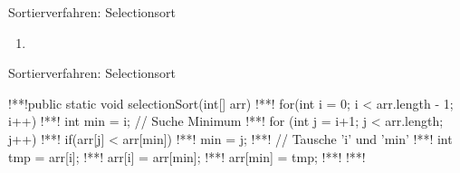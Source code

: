 \begin{frame}{Sortierverfahren: Selectionsort}
\begin{center}
\begin{minipage}{0.9\linewidth}
\begin{multicols}{2}
\begin{enumerate}[<+(1)->]
                    \item {}
                \end{enumerate}
            \end{multicols}
        \end{minipage}
    \end{center}
\end{frame}

\begin{frame}[fragile,c]{Sortierverfahren: Selectionsort}
    \begin{plainjava}
!**!public static void selectionSort(int[] arr) {
!**!    for(int i = 0; i < arr.length - 1; i++) {
!**!        int min = i; // Suche Minimum
!**!        for (int j = i+1; j < arr.length; j++)
!**!            if(arr[j] < arr[min])
!**!                min = j;
!**!        // Tausche 'i' und 'min'
!**!        int tmp = arr[i];
!**!        arr[i] = arr[min];
!**!        arr[min] = tmp;
!**!    }
!**!}
    \end{plainjava}
\end{frame}

